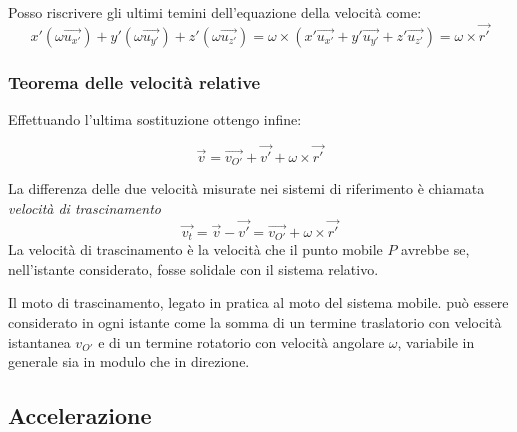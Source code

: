 \documentclass[class=book, crop=false, oneside, 12pt]{standalone}
\begin{document}
Posso riscrivere gli ultimi temini dell'equazione della velocità come:
\begin{equation}
    x' (\omega \overrightarrow{u_{x'}}) + y' (\omega \overrightarrow{u_{y'}}) + z' (\omega \overrightarrow{u_{z'}}) = \omega \times (x' \overrightarrow{u_{x'}} + y' \overrightarrow{u_{y'}} + z' \overrightarrow{u_{z'}}) = \omega \times \overrightarrow{r'}
\end{equation}

\subsubsection{Teorema delle velocità relative}
Effettuando l'ultima sostituzione ottengo infine:

\begin{equation}
    \overrightarrow{v} = \overrightarrow{v_{O'}} + \overrightarrow{v'} + \omega \times \overrightarrow{r'}
\end{equation}

La differenza delle due velocità misurate nei sistemi di riferimento è chiamata \emph{velocità di trascinamento}
\begin{equation*}
    \overrightarrow{v_t} = \overrightarrow{v} - \overrightarrow{v'} = \overrightarrow{v_{O'}} + \omega \times \overrightarrow{r'}
\end{equation*}
La velocità di trascinamento è la velocità che il punto mobile \(P\) avrebbe se, nell’istante considerato, fosse solidale con il sistema relativo.

Il moto di trascinamento, legato in pratica al moto del sistema mobile. può essere considerato in ogni istante come la somma di un termine traslatorio con velocità istantanea \(v_{O'}\) e di un termine rotatorio con velocità angolare \(\omega\), variabile in generale sia in modulo che in direzione.

\subsection{Accelerazione}
\end{document}
